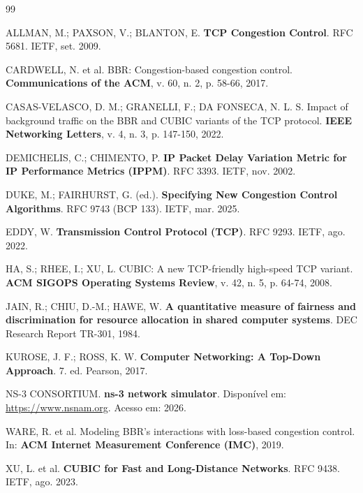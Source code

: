 \documentclass[a4paper,12pt]{monografia}
\begin{document}
\begin{thebibliography}{99}

ALLMAN, M.; PAXSON, V.; BLANTON, E.
\textbf{TCP Congestion Control}.
RFC 5681. IETF, set. 2009.

CARDWELL, N. et al.
BBR: Congestion-based congestion control.
\textbf{Communications of the ACM}, v. 60, n. 2, p. 58-66, 2017.

CASAS-VELASCO, D. M.; GRANELLI, F.; DA FONSECA, N. L. S.
Impact of background traffic on the BBR and CUBIC variants of the TCP protocol.
\textbf{IEEE Networking Letters}, v. 4, n. 3, p. 147-150, 2022.

DEMICHELIS, C.; CHIMENTO, P.
\textbf{IP Packet Delay Variation Metric for IP Performance Metrics (IPPM)}.
RFC 3393. IETF, nov. 2002.

DUKE, M.; FAIRHURST, G. (ed.).
\textbf{Specifying New Congestion Control Algorithms}.
RFC 9743 (BCP 133). IETF, mar. 2025.

EDDY, W.
\textbf{Transmission Control Protocol (TCP)}.
RFC 9293. IETF, ago. 2022.

HA, S.; RHEE, I.; XU, L.
CUBIC: A new TCP-friendly high-speed TCP variant.
\textbf{ACM SIGOPS Operating Systems Review}, v. 42, n. 5, p. 64-74, 2008.

JAIN, R.; CHIU, D.-M.; HAWE, W.
\textbf{A quantitative measure of fairness and discrimination for resource allocation in shared computer systems}.
DEC Research Report TR-301, 1984.

KUROSE, J. F.; ROSS, K. W.
\textbf{Computer Networking: A Top-Down Approach}.
7. ed. Pearson, 2017.

NS-3 CONSORTIUM.
\textbf{ns-3 network simulator}.
Disponível em: \url{https://www.nsnam.org}. Acesso em: 2026.

WARE, R. et al.
Modeling BBR's interactions with loss-based congestion control.
In: \textbf{ACM Internet Measurement Conference (IMC)}, 2019.

XU, L. et al.
\textbf{CUBIC for Fast and Long-Distance Networks}.
RFC 9438. IETF, ago. 2023.

\end{thebibliography}
\end{document}
